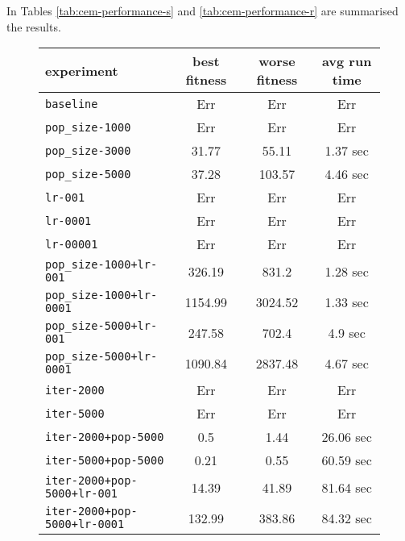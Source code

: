 In Tables \ref{tab:cem-performance-s} and \ref{tab:cem-performance-r} are summarised the results. 
\bigskip

\begin{figure}[htb]
	\centering
	
	\begin{tabular}{lccc}
		\toprule
		\textbf{experiment} & \textbf{best fitness} & \textbf{worse fitness} & \textbf{avg run time} \\
		\midrule
		\texttt{baseline 						}  &	   Err &	    Err &	       Err \\
		\texttt{pop\_size-1000 					}     &	   Err &	    Err &	       Err \\
		\texttt{pop\_size-3000 					}     &	 31.77 &	  55.11 &	  1.37 sec \\
		\texttt{pop\_size-5000 					}     &	 37.28 &	 103.57 &	  4.46 sec \\
		\texttt{lr-001 							}    &	   Err &	    Err &	       Err \\
		\texttt{lr-0001	 						}   &	   Err &	    Err &	       Err \\
		\texttt{lr-00001	 					}  &	   Err &	    Err &	       Err \\
		\texttt{pop\_size-1000+lr-001 			}   &	326.19 &	  831.2 &	  1.28 sec \\
		\texttt{pop\_size-1000+lr-0001 			}   &              1154.99 &	3024.52 &	  1.33 sec \\
		\texttt{pop\_size-5000+lr-001 			}   &	247.58 &	  702.4 &	   4.9 sec \\
		\texttt{pop\_size-5000+lr-0001 			}   &              1090.84 &	2837.48 &	  4.67 sec \\
		\texttt{iter-2000 						}   &	   Err &	    Err &	       Err \\
		\texttt{iter-5000 						}   &	   Err &	    Err &	       Err \\
		\texttt{iter-2000+pop-5000 	}			    &	   0.5 &	   1.44 &	 26.06 sec \\
		\texttt{iter-5000+pop-5000 	}			    &	  0.21 &	   0.55 &	 60.59 sec \\
		\texttt{iter-2000+pop-5000+lr-001 }		    &	 14.39 &	  41.89 &	 81.64 sec \\
		\texttt{iter-2000+pop-5000+lr-0001 }	    &	132.99 &	 383.86 &	 84.32 sec \\
		\bottomrule
	\end{tabular}
	\label{tab:nes-performance-s}
\end{figure}

